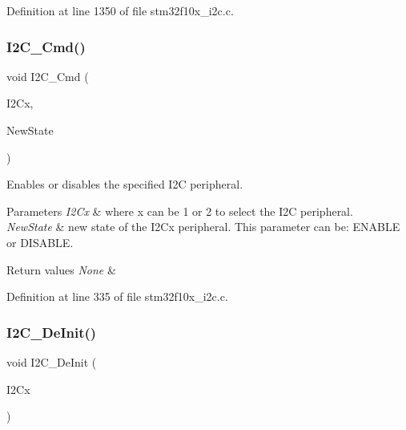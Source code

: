 Definition at line 1350 of file stm32f10x\+\_\+i2c.\+c.

\mbox{\label{group___i2_c___private___functions_ga7e1323c9133c2cb424dfb5b10b7d2f0b}} 
\subsubsection{\texorpdfstring{I2\+C\+\_\+\+Cmd()}{I2C\_Cmd()}}
{\footnotesize\ttfamily void I2\+C\+\_\+\+Cmd (\begin{DoxyParamCaption}\item[{\hyperlink{struct_i2_c___type_def}{I2\+C\+\_\+\+Type\+Def} $\ast$}]{I2\+Cx,  }\item[{\hyperlink{group___exported__types_gac9a7e9a35d2513ec15c3b537aaa4fba1}{Functional\+State}}]{New\+State }\end{DoxyParamCaption})}



Enables or disables the specified I2C peripheral. 


\begin{DoxyParams}{Parameters}
{\em I2\+Cx} & where x can be 1 or 2 to select the I2C peripheral. \\
\hline
{\em New\+State} & new state of the I2\+Cx peripheral. This parameter can be\+: E\+N\+A\+B\+LE or D\+I\+S\+A\+B\+LE. \\
\hline
\end{DoxyParams}

\begin{DoxyRetVals}{Return values}
{\em None} & \\
\hline
\end{DoxyRetVals}


Definition at line 335 of file stm32f10x\+\_\+i2c.\+c.

\mbox{\label{group___i2_c___private___functions_ga2ee214364603059ad5d9089f749f5bfd}} 
\subsubsection{\texorpdfstring{I2\+C\+\_\+\+De\+Init()}{I2C\_DeInit()}}
{\footnotesize\ttfamily void I2\+C\+\_\+\+De\+Init (\begin{DoxyParamCaption}\item[{\hyperlink{struct_i2_c___type_def}{I2\+C\+\_\+\+Type\+Def} $\ast$}]{I2\+Cx }\end{DoxyParamCaption})}



